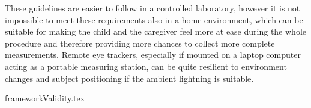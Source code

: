 These guidelines are easier to follow in a controlled laboratory, however it is not impossible to meet these requirements also in a home environment, which can be suitable for making the child and the caregiver feel more at ease during the whole procedure and therefore providing more chances to collect more complete measurements. Remote eye trackers, especially if mounted on a laptop computer acting as a portable measuring station, can be quite resilient to environment changes and subject positioning if the ambient lightning is suitable.



{frameworkValidity.tex}

